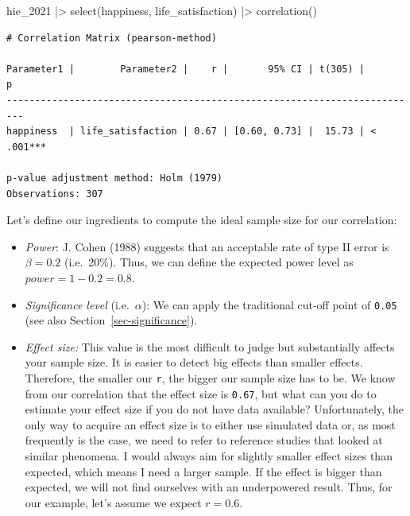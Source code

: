 \documentclass[
  letterpaper,
]{krantz}
\makeatletter
\newenvironment{Shaded}{\begin{snugshade}}{\end{snugshade}}
\newcommand{\FunctionTok}[1]{\textcolor[rgb]{0.28,0.35,0.67}{#1}}
\newcommand{\NormalTok}[1]{\textcolor[rgb]{0.00,0.23,0.31}{#1}}
\newcommand{\SpecialCharTok}[1]{\textcolor[rgb]{0.37,0.37,0.37}{#1}}
\newenvironment{kframe}{%
\medskip{}
\setlength{\fboxsep}{.8em}
 \def\at@end@of@kframe{}%
 \ifinner\ifhmode%
  \def\at@end@of@kframe{\end{minipage}}%
  \begin{minipage}{\columnwidth}%
 \fi\fi%
 \def\FrameCommand##1{\hskip\@totalleftmargin \hskip-\fboxsep
 \colorbox{shadecolor}{##1}\hskip-\fboxsep
     \hskip-\linewidth \hskip-\@totalleftmargin \hskip\columnwidth}%
 \MakeFramed {\advance\hsize-\width
   \@totalleftmargin\z@ \linewidth\hsize
   \@setminipage}}%
 {\par\unskip\endMakeFramed%
 \at@end@of@kframe}
\renewenvironment{Shaded}{\begin{kframe}}{\end{kframe}}
\makeatother
\begin{document}
\begin{Shaded}
\begin{Highlighting}[]
\NormalTok{hie\_2021 }\SpecialCharTok{|\textgreater{}}
  \FunctionTok{select}\NormalTok{(happiness, life\_satisfaction) }\SpecialCharTok{|\textgreater{}}
  \FunctionTok{correlation}\NormalTok{()}
\end{Highlighting}
\end{Shaded}

\begin{verbatim}
# Correlation Matrix (pearson-method)

Parameter1 |        Parameter2 |    r |       95% CI | t(305) |         p
-------------------------------------------------------------------------
happiness  | life_satisfaction | 0.67 | [0.60, 0.73] |  15.73 | < .001***

p-value adjustment method: Holm (1979)
Observations: 307
\end{verbatim}

Let's define our ingredients to compute the ideal sample size for our
correlation:

\begin{itemize}
\item
  \emph{Power}: J. Cohen (1988) suggests that an acceptable rate of type
  II error is \(\beta = 0.2\) (i.e.~20\%). Thus, we can define the
  expected power level as \(power = 1 - 0.2 = 0.8\).
\item
  \emph{Significance level} (i.e.~\(\alpha\)): We can apply the
  traditional cut-off point of \texttt{0.05} (see also
  Section~\ref{sec-significance}).
\item
  \emph{Effect size:} This value is the most difficult to judge but
  substantially affects your sample size. It is easier to detect big
  effects than smaller effects. Therefore, the smaller our \texttt{r},
  the bigger our sample size has to be. We know from our correlation
  that the effect size is \texttt{0.67}, but what can you do to estimate
  your effect size if you do not have data available? Unfortunately, the
  only way to acquire an effect size is to either use simulated data or,
  as most frequently is the case, we need to refer to reference studies
  that looked at similar phenomena. I would always aim for slightly
  smaller effect sizes than expected, which means I need a larger
  sample. If the effect is bigger than expected, we will not find
  ourselves with an underpowered result. Thus, for our example, let's
  assume we expect \(r = 0.6\).
\end{itemize}
\end{document}
